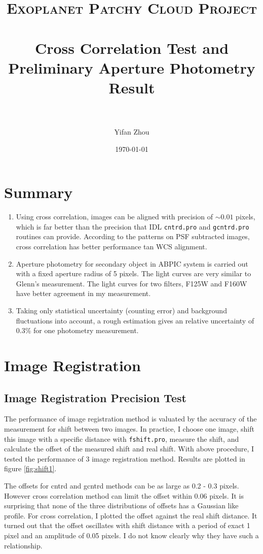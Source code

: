 \documentclass[paper=letter, fontsize=11pt]{scrartcl} %
\title{ 
\normalfont \normalsize 
\textsc{Exoplanet Patchy Cloud Project} \\ [25pt] %
\horrule{0.5pt} \\[0.4cm] %
\huge Cross Correlation Test and Preliminary Aperture Photometry Result\\ %
\horrule{2pt} \\[0.5cm] %
}
\author{Yifan Zhou} %
\date{\normalsize\today} %
\numberwithin{equation}{section} %
\numberwithin{figure}{section} %
\numberwithin{table}{section} %
\begin{document}
\maketitle %
\section{Summary}
\begin{enumerate}
\item Using cross correlation, images can be aligned with precision of
  $\sim 0.01$ pixels, which is far better than the precision that IDL
  \texttt{cntrd.pro} and \texttt{gcntrd.pro} routines can
  provide. According to the patterns on PSF subtracted images, cross
  correlation has better performance tan WCS alignment.
\item Aperture photometry for secondary object in ABPIC system is
  carried out with a fixed aperture radius of 5 pixels. The light
  curves are very similar to Glenn's measurement. The light curves for
  two filters, F125W and F160W have better agreement in my
  measurement.
\item Taking only statistical uncertainty (counting error) and
  background fluctuations into account, a rough estimation gives an
  relative uncertainty of 0.3\% for one photometry measurement.
  
\end{enumerate}
\section{Image Registration}
\subsection{Image Registration Precision Test}
The performance of image registration method is valuated by the accuracy of
the measurement for shift between two images. In practice, I
choose one image, shift this image with a specific distance with
\texttt{fshift.pro}, measure the shift, and calculate the offset of
the measured shift and real shift. With above procedure, I tested the
performance of 3 image registration method. Results are plotted in figure \ref{fig:shift1}.\par

The offsets for cntrd and gcntrd methods can be as large as 0.2 - 0.3
pixels. However cross correlation method can limit the offset within
0.06 pixels. It is surprising that none of the three distributions of
offsets has a Gaussian like  profile. For cross correlation, I plotted
the offset against the real shift distance. It turned out that the
offset oscillates with shift distance with a period of exact 1 pixel
and an amplitude of 0.05 pixels. I do not know clearly why they have
such a relationship.\par
\end{document}
